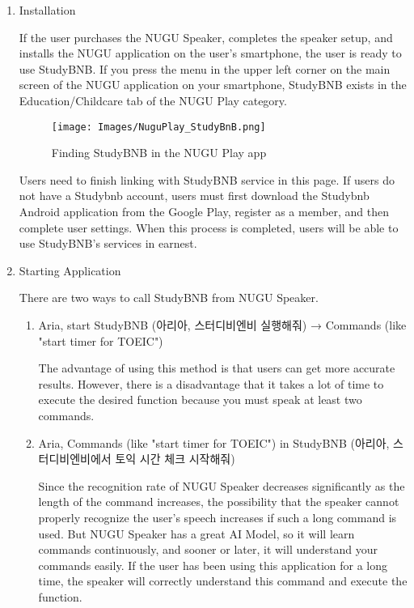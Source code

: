 \documentclass[conference]{IEEEtran}
\begin{document}
\begin{enumerate}
    \item Installation
    
If the user purchases the NUGU Speaker, completes the speaker setup, and installs the NUGU application on the user's smartphone, the user is ready to use StudyBNB. If you press the menu in the upper left corner on the main screen of the NUGU application on your smartphone, StudyBNB exists in the Education/Childcare tab of the NUGU Play category.

\begin{figure}[htp]
    \centering
    \texttt{[image: Images/NuguPlay\_StudyBnB.png]}
    \caption{Finding StudyBNB in the NUGU Play app}
\end{figure}

Users need to finish linking with StudyBNB service in this page. If users do not have a Studybnb account, users must first download the Studybnb Android application from the Google Play, register as a member, and then complete user settings. When this process is completed, users will be able to use StudyBNB's services in earnest.\\
    
    \item Starting Application
    
    There are two ways to call StudyBNB from NUGU Speaker.
    
    \begin{enumerate}
        \item Aria, start StudyBNB (아리아, 스터디비엔비 실행해줘) → Commands (like "start timer for TOEIC")
        
The advantage of using this method is that users can get more accurate results. However, there is a disadvantage that it takes a lot of time to execute the desired function because you must speak at least two commands.
        \item Aria, Commands (like "start timer for TOEIC") in StudyBNB (아리아, 스터디비엔비에서 토익 시간 체크 시작해줘)
        
Since the recognition rate of NUGU Speaker decreases significantly as the length of the command increases, the possibility that the speaker cannot properly recognize the user's speech increases if such a long command is used. But NUGU Speaker has a great AI Model, so it will learn commands continuously, and sooner or later, it will understand your commands easily. If the user has been using this application for a long time, the speaker will correctly understand this command and execute the function.\\


\end{enumerate}
\end{enumerate}
\end{document}
